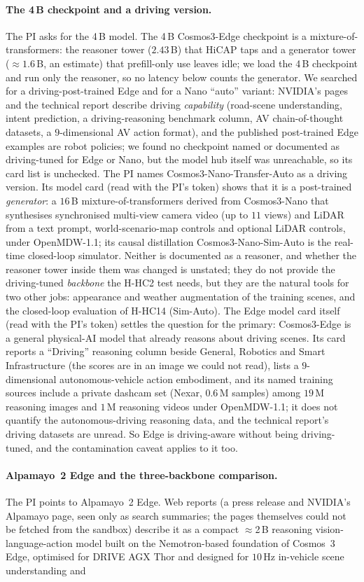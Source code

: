 \paragraph{The 4\,B checkpoint and a driving version.}
The PI asks for the 4\,B model. The 4\,B Cosmos3-Edge checkpoint is a mixture-of-transformers: the reasoner tower ($2.43$\,B) that HiCAP taps and a generator tower ($\approx1.6$\,B, an estimate) that prefill-only use leaves idle; we load the 4\,B checkpoint and run only the reasoner, so no latency below counts the generator. We searched for a driving-post-trained Edge and for a Nano ``auto'' variant: NVIDIA's pages and the technical report describe driving \emph{capability} (road-scene understanding, intent prediction, a driving-reasoning benchmark column, AV chain-of-thought datasets, a $9$-dimensional AV action format), and the published post-trained Edge examples are robot policies; we found no checkpoint named or documented as driving-tuned for Edge or Nano, but the model hub itself was unreachable, so its card list is unchecked. The PI names Cosmos3-Nano-Transfer-Auto as a driving version. Its model card (read with the PI's token) shows that it is a post-trained \emph{generator}: a $16$\,B mixture-of-transformers derived from Cosmos3-Nano that synthesises synchronised multi-view camera video (up to $11$ views) and LiDAR from a text prompt, world-scenario-map controls and optional LiDAR controls, under OpenMDW-1.1; its causal distillation Cosmos3-Nano-Sim-Auto is the real-time closed-loop simulator. Neither is documented as a reasoner, and whether the reasoner tower inside them was changed is unstated; they do not provide the driving-tuned \emph{backbone} the H-HC2 test needs, but they are the natural tools for two other jobs: appearance and weather augmentation of the training scenes, and the closed-loop evaluation of H-HC14 (Sim-Auto). The Edge model card itself (read with the PI's token) settles the question for the primary: Cosmos3-Edge is a general physical-AI model that already reasons about driving scenes. Its card reports a ``Driving'' reasoning column beside General, Robotics and Smart Infrastructure (the scores are in an image we could not read), lists a $9$-dimensional autonomous-vehicle action embodiment, and its named training sources include a private dashcam set (Nexar, $0.6$\,M samples) among $19$\,M reasoning images and $1$\,M reasoning videos under OpenMDW-1.1; it does not quantify the autonomous-driving reasoning data, and the technical report's driving datasets are unread. So Edge is driving-aware without being driving-tuned, and the contamination caveat applies to it too. \paragraph{Alpamayo~2 Edge and the three-backbone comparison.} The PI points to Alpamayo~2 Edge. Web reports (a press release and NVIDIA's Alpamayo page, seen only as search summaries; the pages themselves could not be fetched from the sandbox) describe it as a compact $\approx$2\,B reasoning vision-language-action model built on the Nemotron-based foundation of Cosmos~3 Edge, optimised for DRIVE AGX Thor and designed for $10$\,Hz in-vehicle scene understanding and 